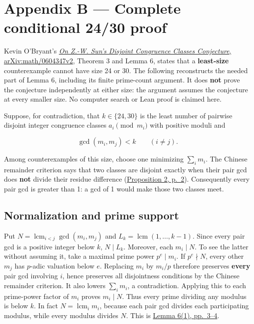 \documentclass[11pt,a4paper]{article}
\begin{document}
\section{Appendix B --- Complete conditional 24/30 proof}\label{appendix-b-complete-conditional-2430-proof}

Kevin O'Bryant's \href{https://arxiv.org/pdf/math/0604347v2}{\emph{On Z.-W. Sun's Disjoint Congruence Classes Conjecture}, arXiv:math/0604347v2}, Theorem 3 and Lemma 6, states that a \textbf{least-size} counterexample cannot have size 24 or 30. The following reconstructs the needed part of Lemma 6, including its finite prime-count argument. It does \textbf{not} prove the conjecture independently at either size: the argument assumes the conjecture at every smaller size. No computer search or Lean proof is claimed here.

Suppose, for contradiction, that \(k\in\{24,30\}\) is the least number of pairwise disjoint integer congruence classes \(a_i\pmod{m_i}\) with positive moduli and

\[
  \gcd(m_i,m_j)<k\qquad(i\ne j).
\]

Among counterexamples of this size, choose one minimizing \(\sum_i m_i\). The Chinese remainder criterion says that two classes are disjoint exactly when their pair gcd does \textbf{not} divide their residue difference (\href{https://arxiv.org/pdf/math/0604347v2}{Proposition 2, p.~2}). Consequently every pair gcd is greater than 1: a gcd of 1 would make those two classes meet.

\subsection{Normalization and prime support}\label{normalization-and-prime-support}

Put \(N=\operatorname{lcm}_{i<j}\gcd(m_i,m_j)\) and \(L_k=\operatorname{lcm}(1,\ldots,k-1)\). Since every pair gcd is a positive integer below \(k\), \(N\mid L_k\). Moreover, each \(m_i\mid N\). To see the latter without assuming it, take a maximal prime power \(p^e\mid m_i\). If \(p^e\nmid N\), every other \(m_j\) has \(p\)-adic valuation below \(e\). Replacing \(m_i\) by \(m_i/p\) therefore preserves \textbf{every} pair gcd involving \(i\), hence preserves all disjointness conditions by the Chinese remainder criterion. It also lowers \(\sum_i m_i\), a contradiction. Applying this to each prime-power factor of \(m_i\) proves \(m_i\mid N\). Thus every prime dividing any modulus is below \(k\). In fact \(N=\operatorname{lcm}_i m_i\), because each pair gcd divides each participating modulus, while every modulus divides \(N\). This is \href{https://arxiv.org/pdf/math/0604347v2}{Lemma 6(1), pp.~3--4}.
\end{document}
